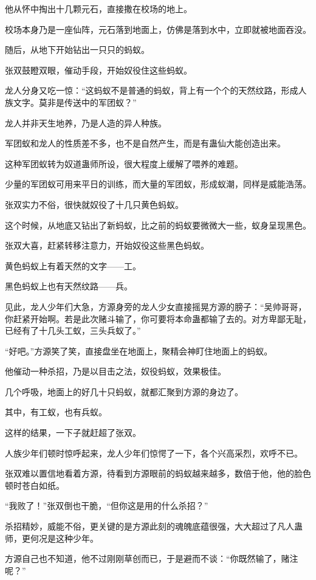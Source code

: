 \begin{this_body}
他从怀中掏出十几颗元石，直接撒在校场的地上。

校场本身乃是一座仙阵，元石落到地面上，仿佛是落到水中，立即就被地面吞没。

随后，从地下开始钻出一只只的蚂蚁。

张双鼓瞪双眼，催动手段，开始奴役住这些蚂蚁。

龙人分身又吃一惊：“这蚂蚁不是普通的蚂蚁，背上有一个个的天然纹路，形成人族文字。莫非是传送中的军团蚁？”

龙人并非天生地养，乃是人造的异人种族。

军团蚁和龙人的性质差不多，也不是自然产生，而是有蛊仙大能创造出来。

这种军团蚁转为奴道蛊师所设，很大程度上缓解了喂养的难题。

少量的军团蚁可用来平日的训练，而大量的军团蚁，形成蚁潮，同样是威能浩荡。

张双实力不俗，很快就奴役了十几只黄色蚂蚁。

这个时候，从地底又钻出了新蚂蚁，比之前的蚂蚁要微微大一些，蚁身呈现黑色。

张双大喜，赶紧转移注意力，开始奴役这些黑色蚂蚁。

黄色蚂蚁上有着天然的文字——工。

黑色蚂蚁上也有天然纹路——兵。

见此，龙人少年们大急，方源身旁的龙人少女直接摇晃方源的膀子：“吴帅哥哥，你赶紧开始啊。若是此次赌斗输了，你可要将本命蛊都输了去的。对方卑鄙无耻，已经有了十几头工蚁，三头兵蚁了。”

“好吧。”方源笑了笑，直接盘坐在地面上，聚精会神盯住地面上的蚂蚁。

他催动一种杀招，乃是以目击之法，奴役蚂蚁，效果极佳。

几个呼吸，地面上的好几十只蚂蚁，就都汇聚到方源的身边了。

其中，有工蚁，也有兵蚁。

这样的结果，一下子就赶超了张双。

人族少年们顿时惊呼起来，龙人少年们惊愕了一下，各个兴高采烈，欢呼不已。

张双难以置信地看着方源，待看到方源眼前的蚂蚁越来越多，数倍于他，他的脸色顿时苍白如纸。

“我败了！”张双倒也干脆，“但你这是用的什么杀招？”

杀招精妙，威能不俗，更关键的是方源此刻的魂魄底蕴很强，大大超过了凡人蛊师，更何况是这种少年。

方源自己也不知道，他不过刚刚草创而已，于是避而不谈：“你既然输了，赌注呢？”


\end{this_body}
